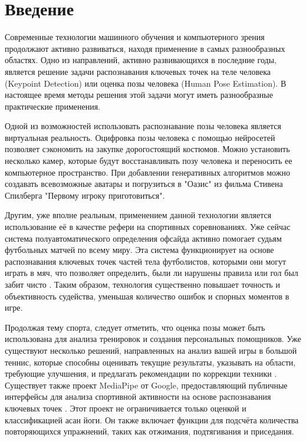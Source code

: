 \section{Введение}
\label{sec:Chapter0} 


Современные технологии машинного обучения и компьютерного зрения продолжают активно развиваться, находя применение в самых разнообразных областях. Одно из направлений, активно развивающихся в последние годы, является решение задачи распознавания ключевых точек на теле человека (Keypoint Detection) или оценка позы человека (Human Pose Estimation). В настоящее время методы решения этой задачи могут иметь разнообразные практические применения.

Одной из возможностей использовать распознавание позы человека является виртуальная реальность. Оцифровка позы человека с помощью нейросетей позволяет сэкономить на закупке дорогостоящий костюмов. Можно установить несколько камер, которые будут восстанавливать позу человека и переносить ее компьютерное пространство. При добавлении генеративных алгоритмов можно создавать всевозможные аватары и погрузиться в "Оазис" из фильма Стивена Спилберга "Первому игроку приготовиться".

Другим, уже вполне реальным, применением данной технологии является использование её в качестве рефери на спортивных соревнованиях. Уже сейчас система полуавтоматического определения офсайда активно помогает судьям футбольных матчей по всему миру. Эта система функционирует на основе распознавания ключевых точек частей тела футболистов, которыми они могут играть в мяч, что позволяет определить, были ли нарушены правила или гол был забит чисто \cite{fifaOffside}. Таким образом, технология существенно повышает точность и объективность судейства, уменьшая количество ошибок и спорных моментов в игре.

Продолжая тему спорта, следует отметить, что оценка позы может быть использована для анализа тренировок и создания персональных помощников. Уже существуют несколько решений, направленных на анализ вашей игры в большой теннис, которые способны оценивать текущие результаты, указывать на области, требующие улучшения, и предлагать рекомендации по коррекции техники \cite{IEEETennis, tennisTrener}. Существует также проект MediaPipe от Google, предоставляющий публичные интерфейсы для анализа спортивной активности на основе распознавания ключевых точек \cite{mediapipe}. Этот проект не ограничивается только оценкой и классификацией асан йоги. Он также включает функции для подсчёта количества повторяющихся упражнений, таких как отжимания, подтягивания и приседания. 

